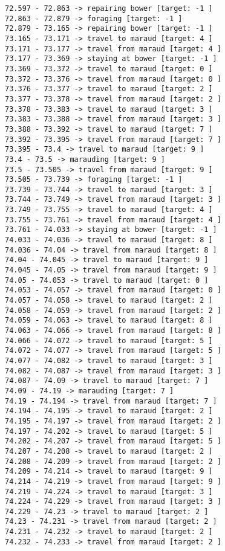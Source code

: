 \documentclass[11pt]{article}
\begin{document}
\begin{Verbatim}[commandchars=\\\{\}]
72.597 - 72.863 -> repairing bower [target: -1 ]
72.863 - 72.879 -> foraging [target: -1 ]
72.879 - 73.165 -> repairing bower [target: -1 ]
73.165 - 73.171 -> travel to maraud [target: 4 ]
73.171 - 73.177 -> travel from maraud [target: 4 ]
73.177 - 73.369 -> staying at bower [target: -1 ]
73.369 - 73.372 -> travel to maraud [target: 0 ]
73.372 - 73.376 -> travel from maraud [target: 0 ]
73.376 - 73.377 -> travel to maraud [target: 2 ]
73.377 - 73.378 -> travel from maraud [target: 2 ]
73.378 - 73.383 -> travel to maraud [target: 3 ]
73.383 - 73.388 -> travel from maraud [target: 3 ]
73.388 - 73.392 -> travel to maraud [target: 7 ]
73.392 - 73.395 -> travel from maraud [target: 7 ]
73.395 - 73.4 -> travel to maraud [target: 9 ]
73.4 - 73.5 -> marauding [target: 9 ]
73.5 - 73.505 -> travel from maraud [target: 9 ]
73.505 - 73.739 -> foraging [target: -1 ]
73.739 - 73.744 -> travel to maraud [target: 3 ]
73.744 - 73.749 -> travel from maraud [target: 3 ]
73.749 - 73.755 -> travel to maraud [target: 4 ]
73.755 - 73.761 -> travel from maraud [target: 4 ]
73.761 - 74.033 -> staying at bower [target: -1 ]
74.033 - 74.036 -> travel to maraud [target: 8 ]
74.036 - 74.04 -> travel from maraud [target: 8 ]
74.04 - 74.045 -> travel to maraud [target: 9 ]
74.045 - 74.05 -> travel from maraud [target: 9 ]
74.05 - 74.053 -> travel to maraud [target: 0 ]
74.053 - 74.057 -> travel from maraud [target: 0 ]
74.057 - 74.058 -> travel to maraud [target: 2 ]
74.058 - 74.059 -> travel from maraud [target: 2 ]
74.059 - 74.063 -> travel to maraud [target: 8 ]
74.063 - 74.066 -> travel from maraud [target: 8 ]
74.066 - 74.072 -> travel to maraud [target: 5 ]
74.072 - 74.077 -> travel from maraud [target: 5 ]
74.077 - 74.082 -> travel to maraud [target: 3 ]
74.082 - 74.087 -> travel from maraud [target: 3 ]
74.087 - 74.09 -> travel to maraud [target: 7 ]
74.09 - 74.19 -> marauding [target: 7 ]
74.19 - 74.194 -> travel from maraud [target: 7 ]
74.194 - 74.195 -> travel to maraud [target: 2 ]
74.195 - 74.197 -> travel from maraud [target: 2 ]
74.197 - 74.202 -> travel to maraud [target: 5 ]
74.202 - 74.207 -> travel from maraud [target: 5 ]
74.207 - 74.208 -> travel to maraud [target: 2 ]
74.208 - 74.209 -> travel from maraud [target: 2 ]
74.209 - 74.214 -> travel to maraud [target: 9 ]
74.214 - 74.219 -> travel from maraud [target: 9 ]
74.219 - 74.224 -> travel to maraud [target: 3 ]
74.224 - 74.229 -> travel from maraud [target: 3 ]
74.229 - 74.23 -> travel to maraud [target: 2 ]
74.23 - 74.231 -> travel from maraud [target: 2 ]
74.231 - 74.232 -> travel to maraud [target: 2 ]
74.232 - 74.233 -> travel from maraud [target: 2 ]

\end{Verbatim}
\end{document}
